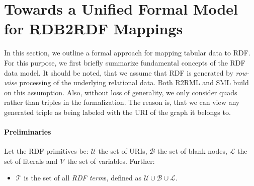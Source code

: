 

\section{Towards a Unified Formal Model for RDB2RDF Mappings}
\label{sec:model}

In this section, we outline a formal approach for mapping tabular data to RDF.
For this purpose, we first briefly summarize fundamental concepts of the RDF data model.
It should be noted, that we assume that RDF is generated by
\emph{row-wise} processing of the underlying relational data.
Both R2RML and SML build on this assumption.
Also, without loss of generality, we only consider quads rather than triples in the formalization.
The reason is, that we can view any generated triple as being labeled with the URI of the graph it belongs to.

\paragraph{Preliminaries}
\label{sec:transformation-preliminaries}
Let the RDF primitives be: $\mathcal{U}$ the set of URIs, $\mathcal{B}$ the set
of blank nodes, $\mathcal{L}$ the set of literals and $\mathcal{V}$ the set of
variables. Further:
\begin{itemize}
 \item $\mathcal{T}$ is the set of all \emph{RDF term}s, defined as
  $\mathcal{U} \cup \mathcal{B} \cup \mathcal{L}$.
\end{itemize}

